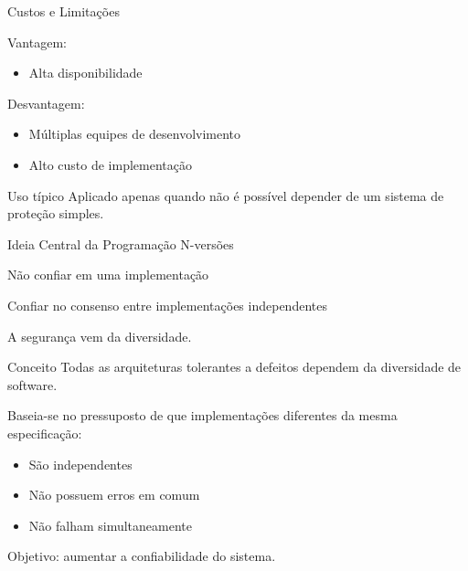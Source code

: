 \documentclass[9pt]{beamer}
\begin{document}
\begin{frame}{Custos e Limitações}
\small

Vantagem:
\begin{itemize}
    \item Alta disponibilidade
\end{itemize}

Desvantagem:
\begin{itemize}
    \item Múltiplas equipes de desenvolvimento
    \item Alto custo de implementação
\end{itemize}

\begin{alertblock}{Uso típico}
Aplicado apenas quando não é possível depender
de um sistema de proteção simples.
\end{alertblock}

\end{frame}
\begin{frame}{Ideia Central da Programação N-versões}
\centering

\Large
Não confiar em uma implementação

\vspace{0.4cm}

\Large
Confiar no consenso entre implementações independentes

\vspace{0.8cm}

\small
A segurança vem da diversidade.

\end{frame}

\begin{frame}{Conceito}
Todas as arquiteturas tolerantes a defeitos dependem da diversidade de software.

\bigskip

Baseia-se no pressuposto de que implementações diferentes da mesma especificação:

\begin{itemize}
\item São independentes
\item Não possuem erros em comum
\item Não falham simultaneamente
\end{itemize}

\bigskip

Objetivo: aumentar a confiabilidade do sistema.
\end{frame}

\end{document}
